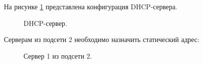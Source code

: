 \documentclass[a4paper,14pt]{article}
\begin{document}
 \newpage

На рисунке \ref{fig:dhcps} представлена конфигурация DHCP-сервера.

 \begin{figure}[!h]
     \caption{DHCP-сервер.}
     \label{fig:dhcps}
 \end{figure}

 \newpage

 Серверам из подсети 2 необходимо назначить статический адрес:

 \begin{figure}[!h]
     \caption{Сервер 1 из подсети 2.}
     \label{fig:s21}
 \end{figure}
\end{document}
